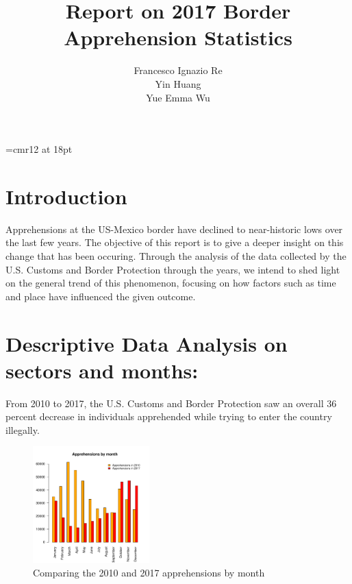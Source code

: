 \documentclass[journal, a4paper]{IEEEtran}
\begin{document}


\font\myfont=cmr12 at 18pt
	
	\title{ \myfont Report on 2017 Border Apprehension Statistics}
	\author{Francesco Ignazio Re\\
			Yin Huang	\\
			Yue Emma Wu
			}

	\maketitle

	
	\section{Introduction}

	Apprehensions at the US-Mexico border have declined to near-historic lows over the last few years.
	The objective of this report is to give a deeper insight on this change that has been occuring.
	Through the analysis of the data collected by the U.S. Customs and Border Protection through the years,
	we intend to shed light on the general trend of this phenomenon, focusing on how factors such as time and place have influenced the given outcome.
	
	
	

	
	
	
	\section{Descriptive Data Analysis on sectors and months:}
	
	From 2010 to 2017, the U.S. Customs and Border Protection saw an overall 36 percent decrease in individuals apprehended while trying to enter the country illegally. 






\begin{figure}[!hbt]
\begin{center}

{

\includegraphics[width=0.4\textwidth]{pdf_template3-fig1}
\caption{Comparing the 2010 and 2017 apprehensions by month}
}

\end{center}
\end{figure} 
\end{document}
